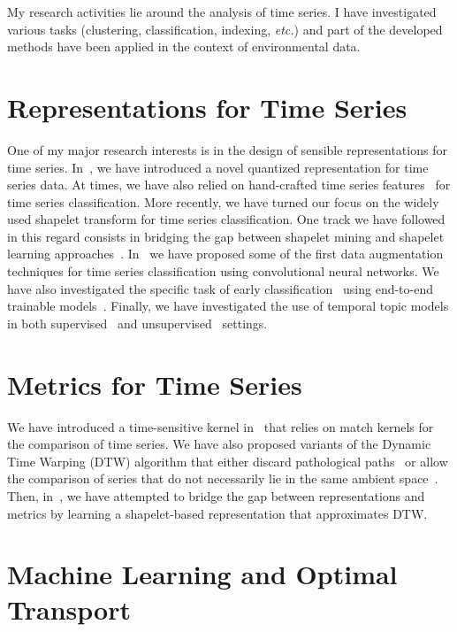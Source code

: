 My research activities lie around the analysis of time series.
I have investigated various tasks (clustering, classification, indexing, \emph{etc.}) and part of the developed methods have been applied in the context of environmental data.

\section*{Representations for Time Series}

One of my major research interests is in the design of sensible representations for time series.
In~\cite{malinowski:halshs-00912512}, we have introduced a novel quantized representation for time series data.
At times, we have also relied on hand-crafted time series features~\cite{bailly:halshs-01184900,bailly:hal-01252726} for time series classification.
More recently, we have turned our focus on the widely used shapelet transform for time series classification.
One track we have followed in this regard consists in bridging the gap between shapelet mining and shapelet learning approaches~\cite{guilleme:hal-02513295,wang2019,guijorubio:hal-02371422}.
In~\cite{leguennec:halshs-01357973} we have proposed some of the first data augmentation techniques for time series classification using convolutional neural networks.
We have also investigated the specific task of early classification~\cite{tavenard:halshs-01339007} using end-to-end trainable models~\cite{ruwurm:hal-02174314}.
Finally, we have investigated the use of temporal topic models in both supervised~\cite{tavenard:hal-00872048} and unsupervised~\cite{gloaguen2020} settings.

\section*{Metrics for Time Series}

We have introduced a time-sensitive kernel in~\cite{tavenard:halshs-01561461} that relies on match kernels for the comparison of time series.
We have also proposed variants of the Dynamic Time Warping (DTW) algorithm that either discard pathological paths~\cite{zhang2017dynamic} or allow the comparison of series that do not necessarily lie in the same ambient space~\cite{vayer2020time}.
Then, in~\cite{lods:hal-01565207}, we have attempted to bridge the gap between representations and metrics by learning a shapelet-based representation that approximates DTW.

\section*{Machine Learning and Optimal Transport}

